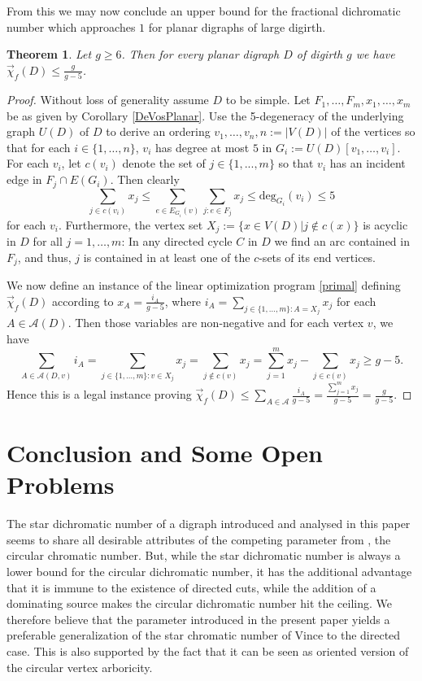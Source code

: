 \documentclass[fontsize=11pt,a4paper,DIV12]{scrartcl}
\theoremstyle{meiner}
\newtheorem{theorem}{Theorem}
\theoremstyle{definition}
\begin{document}
From this we may now conclude an upper bound for the fractional dichromatic number which approaches $1$ for planar digraphs of large digirth.
\begin{theorem}
Let $g \ge 6$. Then for every planar digraph $D$ of digirth $g$ we have $\vec{\chi}_f(D) \leq \frac{g}{g-5}$.
\end{theorem}
\begin{proof}
Without loss of generality assume $D$ to be simple. Let $F_1,\ldots,F_m,x_1,\ldots,x_m$ be as given by Corollary \ref{DeVosPlanar}. Use the 5-degeneracy of the underlying graph $U(D)$ of $D$ to derive an ordering $v_1,\ldots,v_n, n:=|V(D)|$ of the vertices so that for each $i \in \{1,\ldots,n\}$, $v_i$ has degree at most $5$ in $G_i:=U(D)[v_1,\ldots,v_i]$. For each $v_i$, let $c(v_i)$ denote the set of $j \in \{1,...,m\}$ so that $v_i$ has an incident edge in $F_j \cap E(G_i)$. Then clearly $$\sum_{j \in c(v_i)}{x_j} \leq \sum_{e \in E_{G_i}(v)}{\sum_{j: e \in F_j}{x_j}} \leq \text{deg}_{G_i}(v_i) \leq 5$$ for each $v_i$. Furthermore, the vertex set $X_j:=\{x \in V(D)|j \notin c(x)\}$ is acyclic in $D$ for all $j=1,\ldots,m$: In any directed cycle $C$ in $D$ we find an arc contained in $F_j$, and thus, $j$ is contained in at least one of the $c$-sets of its end vertices. \par\noindent We now define an instance of the linear optimization program \ref{primal} defining $\vec{\chi}_f(D)$ according to $x_A=\frac{i_A}{g-5}$, where  $i_A=\sum_{j \in \{1,\ldots,m\}:A=X_j}{x_j}$ for each $A \in \mathcal{A}(D)$. Then those variables are non-negative and for each vertex $v$, we have
$$\sum_{A \in \mathcal{A}(D,v)}{i_A}=\sum_{j \in \{1,\ldots,m\}:v \in X_j}{x_j}=\sum_{j \notin c(v)}{x_j}=\sum_{j=1}^{m}{x_j}-\sum_{j \in c(v)}{x_j} \geq g-5.$$ Hence this is a legal instance proving $\vec{\chi}_f(D) \leq \sum_{A \in \mathcal{A}}{\frac{i_A}{g-5}}=\frac{\sum_{j=1}^{m}{x_j}}{g-5}=\frac{g}{g-5}$.
\end{proof}
\section{Conclusion and Some Open Problems}
The star dichromatic number of a digraph introduced and analysed in
this paper seems to share all desirable attributes of the competing
parameter from \cite{bokal}, the circular chromatic number. But, while
the star dichromatic number is always a lower bound for the circular
dichromatic number, it has the additional advantage that it is immune
to the existence of directed cuts, while the addition of a dominating
source makes the circular dichromatic number hit the ceiling. We
therefore believe that the parameter introduced in the present paper
yields a preferable generalization of the star chromatic
number of Vince to the directed case. This is also supported by the fact that it can be seen as oriented version of the circular vertex arboricity.
\end{document}
